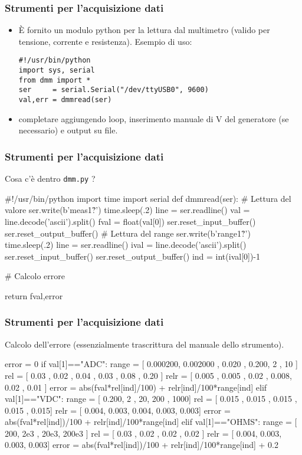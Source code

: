 
\begin{frame}[fragile]
  \frametitle{Strumenti per l'acquisizione dati}
  \begin{itemize}
  \item \`E fornito un modulo python per la lettura dal multimetro (valido per tensione, corrente e resistenza). Esempio di uso:
    \begin{lstlisting}
#!/usr/bin/python
import sys, serial
from dmm import *
ser     = serial.Serial("/dev/ttyUSB0", 9600)
val,err = dmmread(ser)
    \end{lstlisting}
  \item completare aggiungendo loop, inserimento manuale di V del generatore (se necessario) e output su file.
  \end{itemize}
\end{frame}

\begin{frame}[fragile]
  \frametitle{Strumenti per l'acquisizione dati}
  Cosa c'\`e dentro {\tt dmm.py} ?
\begin{python}
#!/usr/bin/python
import time
import serial
def dmmread(ser):
    # Lettura del valore
    ser.write(b'meas1?\r\n')
    time.sleep(.2)
    line = ser.readline()
    val  = line.decode('ascii').split()
    fval = float(val[0])
    ser.reset_input_buffer()
    ser.reset_output_buffer()
    # Lettura del range
    ser.write(b'range1?\r\n')
    time.sleep(.2)
    line  = ser.readline()
    ival  = line.decode('ascii').split()
    ser.reset_input_buffer()
    ser.reset_output_buffer()
    ind = int(ival[0])-1

    # Calcolo errore
    
    return fval,error
\end{python}
\end{frame}

  \begin{frame}[fragile]
  \frametitle{Strumenti per l'acquisizione dati}

  Calcolo dell'errore (essenzialmente trascrittura del manuale dello strumento).
\begin{python}
    error = 0
    if val[1]=="ADC":
        range = [ 0.000200, 0.002000 , 0.020 ,  0.200,  2    , 10  ]
        rel   = [ 0.03    , 0.02    , 0.04  ,  0.03 ,  0.08 , 0.20 ]
        relr  = [ 0.005   , 0.005    , 0.02  ,  0.008,  0.02 , 0.01 ]
        error = abs(fval*rel[ind]/100) + relr[ind]/100*range[ind]
    elif val[1]=="VDC":
        range = [ 0.200,     2 ,    20,  200 ,  1000]
        rel   = [ 0.015 ,  0.015 , 0.015 , 0.015 ,  0.015]
        relr  = [ 0.004,  0.003, 0.004, 0.003, 0.003]  
        error = abs(fval*rel[ind])/100 + relr[ind]/100*range[ind]
    elif val[1]=="OHMS":
        range = [ 200,     2e3 ,    20e3,  200e3 ]
        rel   = [ 0.03 ,  0.02 , 0.02 , 0.02 ]
        relr  = [ 0.004,  0.003, 0.003, 0.003]
        error = abs(fval*rel[ind])/100 + relr[ind]/100*range[ind] + 0.2
\end{python}
\end{frame}


